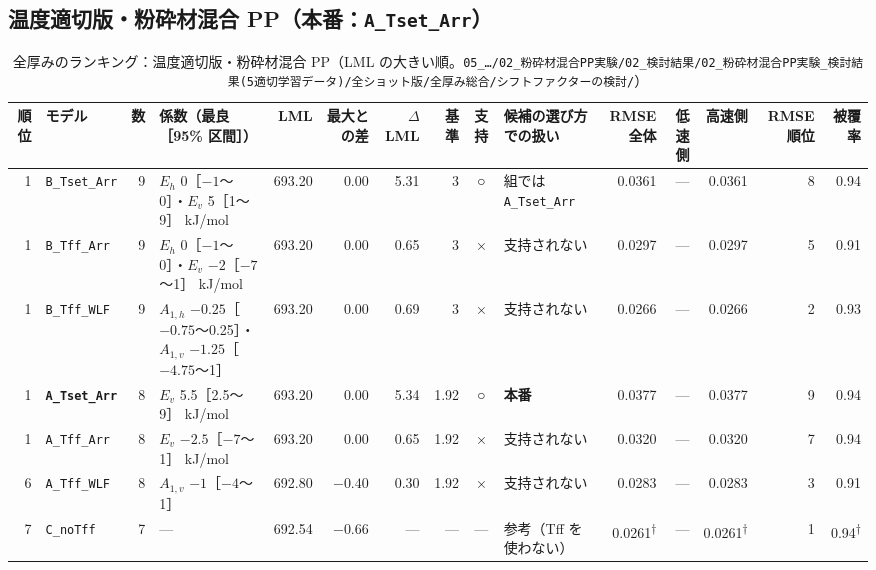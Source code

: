 \documentclass[paper=a4paper,landscape,fontsize=10pt,line_length=62zw,number_of_lines=34]{jlreq}
\let\origtextbf\textbf
\renewcommand{\textbf}[1]{\origtextbf{\gtfamily #1}}   %
\begin{document}
\subsection{温度適切版・粉砕材混合 PP（本番：\texttt{A\_\allowbreak{}Tset\_\allowbreak{}Arr}）}
\begin{table}[H]\centering\footnotesize
\caption{全厚みのランキング：温度適切版・粉砕材混合 PP（LML の大きい順。\texttt{05\_\allowbreak{}…/\allowbreak{}02\_\allowbreak{}粉砕材混合PP実験/\allowbreak{}02\_\allowbreak{}検討結果/\allowbreak{}02\_\allowbreak{}粉砕材混合PP実験\_\allowbreak{}検討結果(5適切学習データ)/\allowbreak{}全ショット版/\allowbreak{}全厚み総合/\allowbreak{}シフトファクターの検討/\allowbreak{}}）}
\begin{tabular}{rlrp{12\zw}rrrrcp{8.5\zw}rrrrr}
\toprule
順位 & モデル & 数 & 係数（最良［95\% 区間］） & LML & 最大との差 & $\Delta$LML & 基準 & 支持 & 候補の選び方での扱い & RMSE 全体 & 低速側 & 高速側 & RMSE 順位 & 被覆率 \\
\midrule
1 & \texttt{B\_\allowbreak{}Tset\_\allowbreak{}Arr} & 9 & $E_h$ 0［$-1$〜0］・$E_v$ 5［1〜9］ kJ/mol & 693.20 & 0.00 & 5.31 & 3 & ○ & 組では \texttt{A\_\allowbreak{}Tset\_\allowbreak{}Arr} & 0.0361 & --- & 0.0361 & 8 & 0.94 \\
1 & \texttt{B\_\allowbreak{}Tff\_\allowbreak{}Arr} & 9 & $E_h$ 0［$-1$〜0］・$E_v$ $-2$［$-7$〜1］ kJ/mol & 693.20 & 0.00 & 0.65 & 3 & × & 支持されない & 0.0297 & --- & 0.0297 & 5 & 0.91 \\
1 & \texttt{B\_\allowbreak{}Tff\_\allowbreak{}WLF} & 9 & $A_{1,h}$ $-0.25$［$-0.75$〜0.25］・$A_{1,v}$ $-1.25$［$-4.75$〜1］ & 693.20 & 0.00 & 0.69 & 3 & × & 支持されない & 0.0266 & --- & 0.0266 & 2 & 0.93 \\
1 & \textbf{\texttt{A\_\allowbreak{}Tset\_\allowbreak{}Arr}} & 8 & $E_v$ 5.5［2.5〜9］ kJ/mol & 693.20 & 0.00 & 5.34 & 1.92 & ○ & \textbf{本番} & 0.0377 & --- & 0.0377 & 9 & 0.94 \\
1 & \texttt{A\_\allowbreak{}Tff\_\allowbreak{}Arr} & 8 & $E_v$ $-2.5$［$-7$〜1］ kJ/mol & 693.20 & 0.00 & 0.65 & 1.92 & × & 支持されない & 0.0320 & --- & 0.0320 & 7 & 0.94 \\
6 & \texttt{A\_\allowbreak{}Tff\_\allowbreak{}WLF} & 8 & $A_{1,v}$ $-1$［$-4$〜1］ & 692.80 & $-0.40$ & 0.30 & 1.92 & × & 支持されない & 0.0283 & --- & 0.0283 & 3 & 0.91 \\
7 & \texttt{C\_\allowbreak{}noTff} & 7 & --- & 692.54 & $-0.66$ & --- & --- & --- & 参考（Tff を使わない） & 0.0261\textsuperscript{†} & --- & 0.0261\textsuperscript{†} & 1 & 0.94\textsuperscript{†} \\

\end{tabular}
\end{table}
\end{document}
